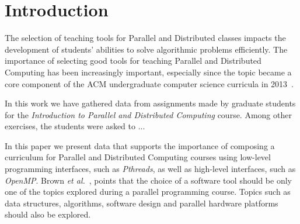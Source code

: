 \section{Introduction}
\label{sec:introduction}


The selection of teaching tools for Parallel and Distributed classes impacts
the development of students' abilities to solve algorithmic problems
efficiently. The importance of selecting good tools for teaching Parallel and
Distributed Computing has been increasingly important, especially since the
topic became a core component of the ACM undergraduate computer science
curricula in 2013~\cite{acmcurricula}.



In this work we have gathered data from assignments made by graduate students
for the \emph{Introduction to Parallel and Distributed Computing} course. Among
other exercises, the students were asked to ...


In this paper we present data that supports the importance of composing a
curriculum for Parallel and Distributed Computing courses using low-level
programming interfaces, such as \textit{Pthreads}, as well as high-level
interfaces, such as \textit{OpenMP}.  Brown \textit{et
al.}~\cite{Brown:2010:SPC:1971681.1971689}, points that the choice of a
software tool should be only one of the topics explored during a parallel
programming course. Topics such as data structures, algorithms, software design
and parallel hardware platforms should also be explored.

